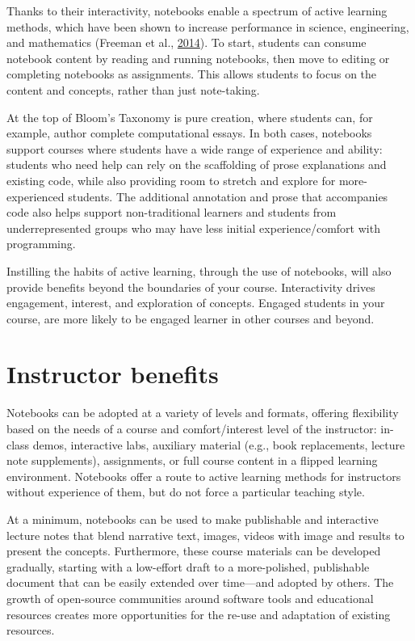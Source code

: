 \documentclass[]{book}
\begin{document}
Thanks to their interactivity, notebooks enable a spectrum of active
learning methods, which have been shown to increase performance in
science, engineering, and mathematics (Freeman et al.,
\protect\hyperlink{ref-freeman2014active}{2014}). To start, students can
consume notebook content by reading and running notebooks, then move to
editing or completing notebooks as assignments. This allows students to
focus on the content and concepts, rather than just note-taking.

At the top of Bloom's Taxonomy is pure creation, where students can, for
example, author complete computational essays. In both cases, notebooks
support courses where students have a wide range of experience and
ability: students who need help can rely on the scaffolding of prose
explanations and existing code, while also providing room to stretch and
explore for more-experienced students. The additional annotation and
prose that accompanies code also helps support non-traditional learners
and students from underrepresented groups who may have less initial
experience/comfort with programming.

Instilling the habits of active learning, through the use of notebooks,
will also provide benefits beyond the boundaries of your course.
Interactivity drives engagement, interest, and exploration of concepts.
Engaged students in your course, are more likely to be engaged learner
in other courses and beyond.

\section{Instructor benefits}\label{instructor-benefits}

Notebooks can be adopted at a variety of levels and formats, offering
flexibility based on the needs of a course and comfort/interest level of
the instructor: in-class demos, interactive labs, auxiliary material
(e.g., book replacements, lecture note supplements), assignments, or
full course content in a flipped learning environment. Notebooks offer a
route to active learning methods for instructors without experience of
them, but do not force a particular teaching style.

At a minimum, notebooks can be used to make publishable and interactive
lecture notes that blend narrative text, images, videos with image and
results to present the concepts. Furthermore, these course materials can
be developed gradually, starting with a low-effort draft to a
more-polished, publishable document that can be easily extended over
time---and adopted by others. The growth of open-source communities
around software tools and educational resources creates more
opportunities for the re-use and adaptation of existing resources.
\end{document}

